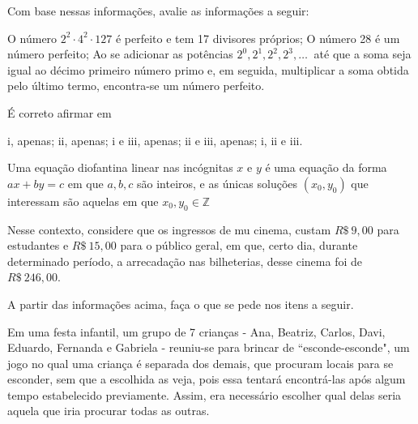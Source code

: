\documentclass[a4paper, 12pt]{exam}
\begin{document}
\begin{questions}
            Com base nessas informações, avalie as informações a seguir:
            \begin{subparts}
                \subpart O número $2^2\cdot4^2\cdot127$ é perfeito e tem 17 divisores próprios;
                \subpart O número 28 é um número perfeito;
                \subpart Ao se adicionar as potências $2^0, 2^1, 2^2, 2^3, \ldots\ $ até que a soma seja igual ao décimo primeiro número primo e, em seguida, multiplicar a soma obtida pelo último termo, encontra-se um número perfeito.
            \end{subparts}


            É correto afirmar em

            \begin{choices}
                \choice i, apenas;
                \choice ii, apenas;
                \choice i e iii, apenas;
                \choice ii e iii, apenas;
                \choice i, ii e iii.
            \end{choices}
        \question
            Uma equação diofantina linear nas incógnitas $x$ e $y$ é uma equação da forma $ax+by=c$ em que $a, b, c$ são inteiros, e as únicas soluções $(x_0, y_0)$ que interessam são aquelas em que $x_0, y_0 \in \mathbb{Z}$
 
            Nesse contexto, considere que os ingressos de mu cinema, custam $R\$\ 9,00$ para estudantes e $R\$\ 15,00$ para o público geral, em que, certo dia, durante determinado período, a arrecadação nas bilheterias, desse cinema foi de $R\$\ 246,00$.

            A partir das informações acima, faça o que se pede nos itens a seguir.
        \question
            Em uma festa infantil, um grupo de 7 crianças - Ana, Beatriz, Carlos, Davi, Eduardo, Fernanda e Gabriela - reuniu-se para brincar de ``esconde-esconde", um jogo no qual uma criança é separada dos demais, que procuram locais para se esconder, sem que a escolhida as veja, pois essa tentará encontrá-las após algum tempo estabelecido previamente. Assim, era necessário escolher qual delas seria aquela que iria procurar todas as outras.


\end{questions}
\end{document}
